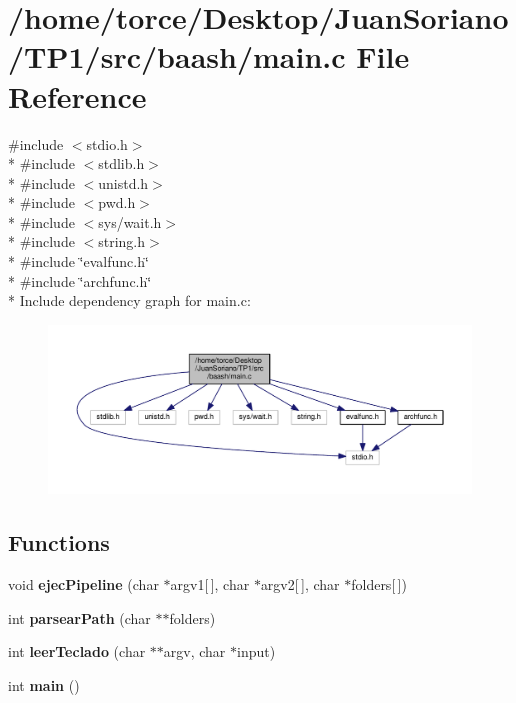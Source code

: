 \section{/home/torce/\+Desktop/\+Juan\+Soriano/\+T\+P1/src/baash/main.c File Reference}
\label{baash_2main_8c}
{\ttfamily \#include $<$stdio.\+h$>$}\\*
{\ttfamily \#include $<$stdlib.\+h$>$}\\*
{\ttfamily \#include $<$unistd.\+h$>$}\\*
{\ttfamily \#include $<$pwd.\+h$>$}\\*
{\ttfamily \#include $<$sys/wait.\+h$>$}\\*
{\ttfamily \#include $<$string.\+h$>$}\\*
{\ttfamily \#include \char`\"{}evalfunc.\+h\char`\"{}}\\*
{\ttfamily \#include \char`\"{}archfunc.\+h\char`\"{}}\\*
Include dependency graph for main.\+c\+:
\nopagebreak
\begin{figure}[H]
\begin{center}
\leavevmode
\includegraphics[width=350pt]{baash_2main_8c__incl}
\end{center}
\end{figure}
\subsection*{Functions}
\begin{DoxyCompactItemize}
\item 
void {\bf ejec\+Pipeline} (char $\ast$argv1[$\,$], char $\ast$argv2[$\,$], char $\ast$folders[$\,$])
\item 
int {\bf parsear\+Path} (char $\ast$$\ast$folders)
\item 
int {\bf leer\+Teclado} (char $\ast$$\ast$argv, char $\ast$input)
\item 
int {\bf main} ()
\end{DoxyCompactItemize}


